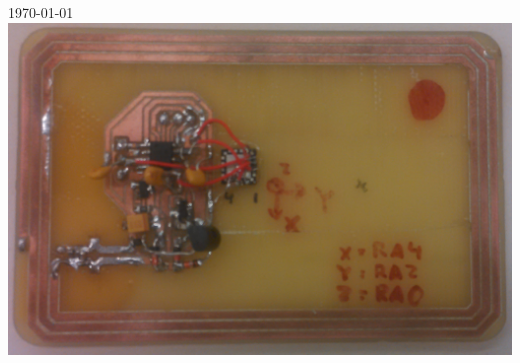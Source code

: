 \begin{titlepage}
\begin{center}
\setcounter{page}{0}
\Huge \doctitle\\[0.3cm]
\large \docauthor\\
\normalsize \today
\\[2cm]
\includegraphics[scale=0.18]{res/tag.jpg}
\end{center}
\end{titlepage}
\normalsize

